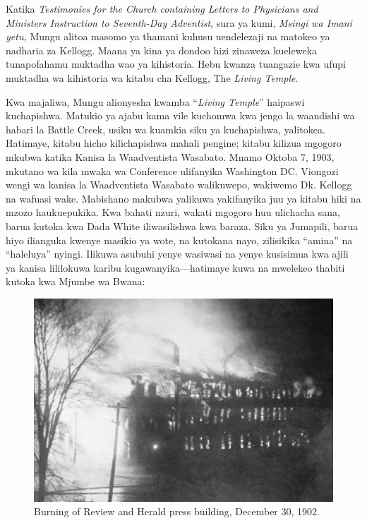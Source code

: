 




Katika \textit{Testimonies for the Church containing Letters to Physicians and Ministers Instruction to Seventh-Day Adventist}, sura ya kumi, \textit{Msingi wa Imani yetu,} Mungu alitoa masomo ya thamani kuhusu uendelezaji na matokeo ya nadharia za Kellogg. Maana ya kina ya dondoo hizi zinaweza kueleweka tunapofahamu muktadha wao ya kihistoria. Hebu kwanza tuangazie kwa ufupi muktadha wa kihistoria wa kitabu cha Kellogg, The \textit{Living Temple}.


Kwa majaliwa, Mungu alionyesha kwamba “\textit{Living Temple}” haipaswi kuchapishwa. Matukio ya ajabu kama vile kuchomwa kwa jengo la waandishi wa habari la Battle Creek, usiku wa kuamkia siku ya kuchapishwa, yalitokea. Hatimaye, kitabu hicho kilichapishwa mahali pengine; kitabu kilizua mgogoro mkubwa katika Kanisa la Waadventista Wasabato. Mnamo Oktoba 7, 1903, mkutano wa kila mwaka wa Conference ulifanyika Washington DC. Viongozi wengi wa kanisa la Waadventista Wasabato walikuwepo, wakiwemo Dk. Kellogg na wafuasi wake. Mabishano makubwa yalikuwa yakifanyika juu ya kitabu hiki na mzozo haukuepukika. Kwa bahati nzuri, wakati mgogoro huu ulichacha sana, barua kutoka kwa Dada White iliwasilishwa kwa baraza. Siku ya Jumapili, barua hiyo ilianguka kwenye masikio ya wote, na kutokana nayo, zilisikika “amina” na “haleluya” nyingi. Ilikuwa asubuhi yenye wasiwasi na yenye kusisimua kwa ajili ya kanisa lililokuwa karibu kugawanyika—hatimaye kuwa na mwelekeo thabiti kutoka kwa Mjumbe wa Bwana:


\begin{figure}[h]
    \centering
    \includegraphics[width=1\linewidth]{images/review-and-herlad.jpg}
    \caption*{Burning of Review and Herald press building, December 30, 1902.}
    \label{fig:review-and-herald}
\end{figure}


